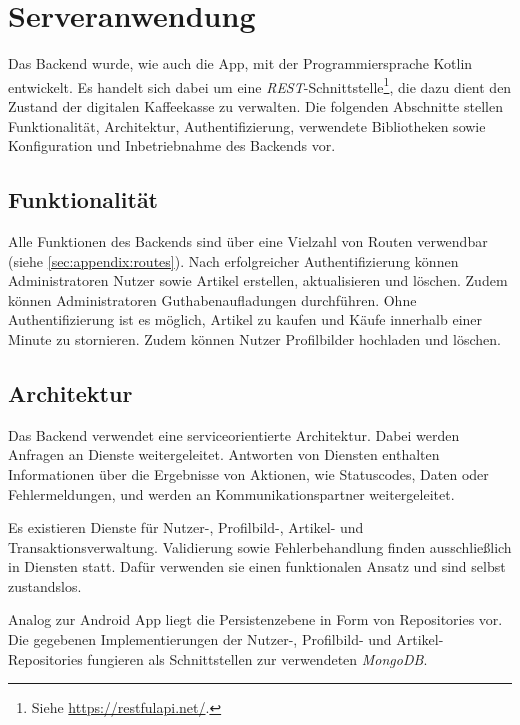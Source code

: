 \section{Serveranwendung}
\label{sec:backend}
Das Backend wurde, wie auch die App, mit der Programmiersprache Kotlin entwickelt.
Es handelt sich dabei um eine \textit{REST}-Schnittstelle\footnote{Siehe \url{https://restfulapi.net/}.}, die dazu dient den Zustand der digitalen Kaffeekasse zu verwalten.
Die folgenden Abschnitte stellen Funktionalität, Architektur, Authentifizierung, verwendete Bibliotheken sowie Konfiguration und Inbetriebnahme des Backends vor.

\subsection{Funktionalität}
\label{subsec:backend:functionality}
Alle Funktionen des Backends sind über eine Vielzahl von Routen verwendbar (siehe \autoref{sec:appendix:routes}).
Nach erfolgreicher Authentifizierung können Administratoren Nutzer sowie Artikel erstellen, aktualisieren und löschen.
Zudem können Administratoren Guthabenaufladungen durchführen.
Ohne Authentifizierung ist es möglich, Artikel zu kaufen und Käufe innerhalb einer Minute zu stornieren.
Zudem können Nutzer Profilbilder hochladen und löschen.

\subsection{Architektur}
\label{subsec:backend:architecture}
Das Backend verwendet eine serviceorientierte Architektur.
Dabei werden Anfragen an Dienste weitergeleitet.
Antworten von Diensten enthalten Informationen über die Ergebnisse von Aktionen, wie Statuscodes, Daten oder Fehlermeldungen, und werden an Kommunikationspartner weitergeleitet.

Es existieren Dienste für Nutzer-, Profilbild-, Artikel- und Transaktionsverwaltung.
Validierung sowie Fehlerbehandlung finden ausschließlich in Diensten statt.
Dafür verwenden sie einen funktionalen Ansatz und sind selbst zustandslos.

Analog zur Android App liegt die Persistenzebene in Form von Repositories vor.
Die gegebenen Implementierungen der Nutzer-, Profilbild- und Artikel-Repositories fungieren als Schnittstellen zur verwendeten \textit{MongoDB}.


